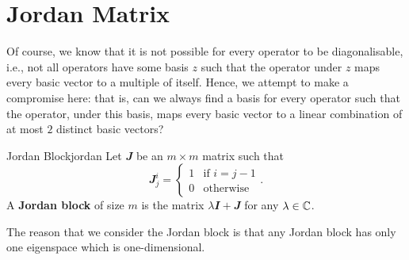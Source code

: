 \documentclass[math, code]{amznotes}
\theoremstyle{remark}
\begin{document}
\section{Jordan Matrix}
Of course, we know that it is not possible for every operator to be diagonalisable, i.e., not all operators have some basis $z$ such that the operator under $z$ maps every basic vector to a multiple of itself. Hence, we attempt to make a compromise here: that is, can we always find a basis for every operator such that the operator, under this basis, maps every basic vector to a linear combination of at most $2$ distinct basic vectors?
\begin{dfnbox}{Jordan Block}{jordan}
    Let $\mathbfit{J}$ be an $m \times m$ matrix such that 
    \begin{equation*}
        \mathbfit{J}^i_j = \begin{cases}
            1 & \textrm{if } i = j - 1 \\
            0 & \textrm{otherwise}
        \end{cases}.
    \end{equation*}
    A {\color{red} \textbf{Jordan block}} of size $m$ is the matrix $\lambda\mathbfit{I} + \mathbfit{J}$ for any $\lambda \in \mathbb{C}$.
\end{dfnbox}
The reason that we consider the Jordan block is that any Jordan block has only one eigenspace which is one-dimensional.
\end{document}
